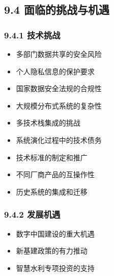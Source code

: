 \hypertarget{ux9762ux4e34ux7684ux6311ux6218ux4e0eux673aux9047}{%
\subsection{9.4 面临的挑战与机遇}\label{ux9762ux4e34ux7684ux6311ux6218ux4e0eux673aux9047}}

\hypertarget{ux6280ux672fux6311ux6218}{%
\subsubsection{9.4.1 技术挑战}\label{ux6280ux672fux6311ux6218}}


\begin{itemize}
\tightlist
\item
  多部门数据共享的安全风险
\item
  个人隐私信息的保护要求
\item
  国家数据安全法规的合规性
\end{itemize}


\begin{itemize}
\tightlist
\item
  大规模分布式系统的复杂性
\item
  多技术栈集成的挑战
\item
  系统演化过程中的技术债务
\end{itemize}


\begin{itemize}
\tightlist
\item
  技术标准的制定和推广
\item
  不同厂商产品的互操作性
\item
  历史系统的集成和迁移
\end{itemize}

\hypertarget{ux53d1ux5c55ux673aux9047-1}{%
\subsubsection{9.4.2 发展机遇}\label{ux53d1ux5c55ux673aux9047-1}}


\begin{itemize}
\tightlist
\item
  数字中国建设的重大机遇
\item
  新基建政策的有力推动
\item
  智慧水利专项投资的支持
\end{itemize}

